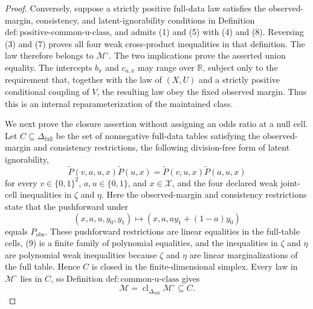 \documentclass{article}
\begin{document}
\begin{proof}
Conversely, suppose a strictly positive full-data law satisfies the observed-margin, consistency, and latent-ignorability conditions in Definition \(\mathrm{def{:}positive\text{-}common\text{-}u\text{-}class}\), and admits (1) and (5) with (4) and (8).  Reversing (3) and (7) proves all four weak cross-product inequalities in that definition.  The law therefore belongs to \(\mathcal M^{\circ}\).  The two implications prove the asserted union equality.  The intercepts \(b_x\) and \(c_{a,x}\) may range over \(\mathbb R\), subject only to the requirement that, together with the law of \((X,U)\) and a strictly positive conditional coupling of \(V\), the resulting law obey the fixed observed margin.  Thus this is an internal reparameterization of the maintained class.

We next prove the closure assertion without assigning an odds ratio at a null cell.  Let \(C\subseteq\Delta_{\mathrm{full}}\) be the set of nonnegative full-data tables satisfying the observed-margin and consistency restrictions, the following division-free form of latent ignorability,
\[
\widetilde P(v,a,u,x)\widetilde P(u,x)
=\widetilde P(v,u,x)\widetilde P(a,u,x)                  \tag{9}
\]
for every \(v\in\{0,1\}^2\), \(a,u\in\{0,1\}\), and \(x\in\mathcal X\), and the four declared weak joint-cell inequalities in \(\zeta\) and \(\eta\).  Here the observed-margin and consistency restrictions state that the pushforward under
\[
(x,a,u,y_0,y_1)\longmapsto(x,a,ay_1+(1-a)y_0)
\]
equals \(P_{\mathrm{obs}}\).  These pushforward restrictions are linear equalities in the full-table cells, (9) is a finite family of polynomial equalities, and the inequalities in \(\zeta\) and \(\eta\) are polynomial weak inequalities because \(\zeta\) and \(\eta\) are linear marginalizations of the full table.  Hence \(C\) is closed in the finite-dimensional simplex.  Every law in \(\mathcal M^{\circ}\) lies in \(C\), so Definition \(\mathrm{def{:}common\text{-}u\text{-}class}\) gives
\[
\mathcal M
=\operatorname{cl}_{\Delta_{\mathrm{full}}}\mathcal M^{\circ}
\subseteq C.                                              \tag{10}
\]


\end{proof}
\end{document}

